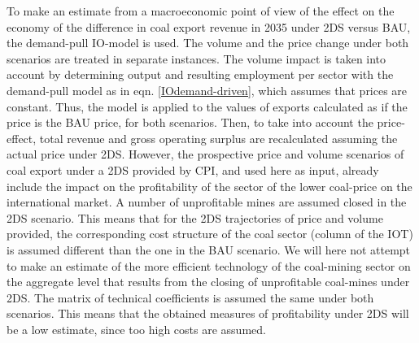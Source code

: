 \documentclass[12pt,english]{article}
\begin{document}

To make an estimate from a macroeconomic point of view of the effect on the economy of the difference in coal export revenue in 2035 under 2DS versus BAU, the demand-pull IO-model is used. %
The volume and the price change under both scenarios are treated in separate instances. The volume impact is taken into account by determining output and resulting employment per sector with the demand-pull model as in eqn. \ref{IOdemand-driven}, which assumes that prices are constant. Thus, the model is applied to the values of exports calculated as if the price is the BAU price, for both scenarios. Then, to take into account the price-effect, total revenue and gross operating surplus are recalculated assuming the actual price under 2DS. However, %
the prospective price and volume scenarios of coal export under a 2DS provided by CPI, and used here as input, already include the impact on the profitability of the sector of the lower coal-price on the international market. A number of unprofitable mines are assumed closed in the 2DS scenario. This means that for the 2DS trajectories of price and volume provided, the corresponding cost structure of the coal sector (column of the IOT) is assumed different than the one in the BAU scenario. We will here not attempt to make an estimate of the more efficient technology of the coal-mining sector on the aggregate level that results from the closing of unprofitable coal-mines under 2DS. The matrix of technical coefficients is assumed the same under both scenarios. This means that the obtained measures of profitability under 2DS will be a low estimate, since too high costs are assumed.
\end{document}
